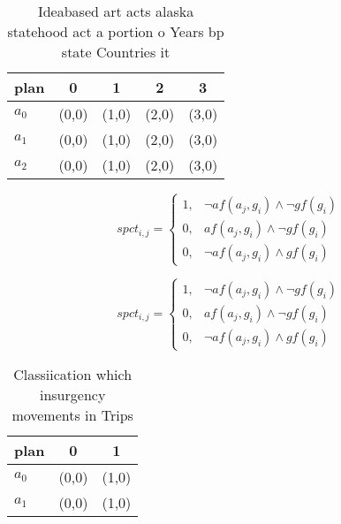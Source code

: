 \documentclass[a4paper]{article}
\begin{document}
\begin{table}
\begin{adjustbox}{width=0.5\columnwidth}
\begin{tabular}{|l|l|l|l|l|}
\hline
\textbf{plan} & \multicolumn{1}{c|}{\textbf{0}} & \multicolumn{1}{c|}{\textbf{1}} & \multicolumn{1}{c|}{\textbf{2}} & \multicolumn{1}{c|}{\textbf{3}} \\ \hline
\textbf{$a_0$}  & (0,0) & (1,0) & (2,0) & (3,0) \\ \hline
\textbf{$a_1$}  & (0,0) & (1,0) & (2,0) & (3,0) \\ \hline
\textbf{$a_2$}  & (0,0) & (1,0) & (2,0) & (3,0) \\ \hline
\end{tabular}
\end{adjustbox}
\caption{Ideabased art acts alaska statehood act a portion o Years bp state Countries it
}
\end{table}

\begin{equation}
spct_{i,j} =
\begin{cases}
1, & \text{$\neg af(a_j,g_i) \wedge \neg gf(g_i)$}\\
0, & \text{$af(a_j,g_i) \wedge \neg gf(g_i)$}\\
0, & \text{$\neg af(a_j,g_i) \wedge gf(g_i)$}
\end{cases}
\end{equation}

\begin{equation}
spct_{i,j} =
\begin{cases}
1, & \text{$\neg af(a_j,g_i) \wedge \neg gf(g_i)$}\\
0, & \text{$af(a_j,g_i) \wedge \neg gf(g_i)$}\\
0, & \text{$\neg af(a_j,g_i) \wedge gf(g_i)$}
\end{cases}
\end{equation}

\begin{table}
\begin{adjustbox}{width=0.5\columnwidth}
\begin{tabular}{|l|l|l|}
\hline
\textbf{plan} & \multicolumn{1}{c|}{\textbf{0}} & \multicolumn{1}{c|}{\textbf{1}} \\ \hline
\textbf{$a_0$}  & (0,0) & (1,0) \\ \hline
\textbf{$a_1$}  & (0,0) & (1,0) \\ \hline
\end{tabular}
\end{adjustbox}
\caption{Classiication which insurgency movements in Trips
}
\end{table}
\end{document}
